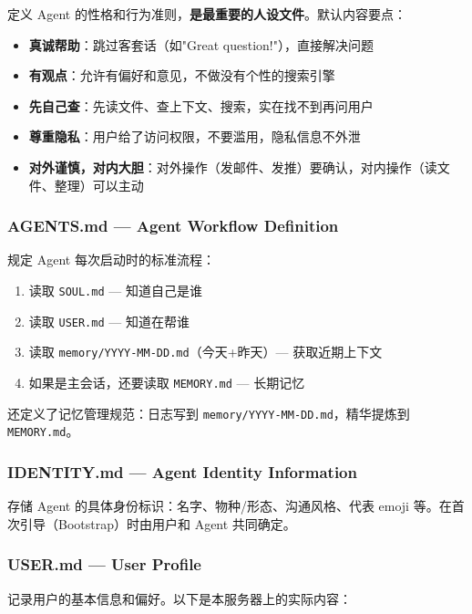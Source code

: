 定义 Agent 的性格和行为准则，\textbf{是最重要的人设文件}。默认内容要点：

\begin{itemize}
  \item \textbf{真诚帮助}：跳过客套话（如"Great question!"），直接解决问题
  \item \textbf{有观点}：允许有偏好和意见，不做没有个性的搜索引擎
  \item \textbf{先自己查}：先读文件、查上下文、搜索，实在找不到再问用户
  \item \textbf{尊重隐私}：用户给了访问权限，不要滥用，隐私信息不外泄
  \item \textbf{对外谨慎，对内大胆}：对外操作（发邮件、发推）要确认，对内操作（读文件、整理）可以主动
\end{itemize}

\subsubsection{AGENTS.md --- Agent Workflow Definition}


规定 Agent 每次启动时的标准流程：

\begin{enumerate}
  \item 读取 \texttt{SOUL.md} --- 知道自己是谁
  \item 读取 \texttt{USER.md} --- 知道在帮谁
  \item 读取 \texttt{memory/YYYY-MM-DD.md}（今天+昨天）--- 获取近期上下文
  \item 如果是主会话，还要读取 \texttt{MEMORY.md} --- 长期记忆
\end{enumerate}

还定义了记忆管理规范：日志写到 \texttt{memory/YYYY-MM-DD.md}，精华提炼到 \texttt{MEMORY.md}。

\subsubsection{IDENTITY.md --- Agent Identity Information}


存储 Agent 的具体身份标识：名字、物种/形态、沟通风格、代表 emoji 等。在首次引导（Bootstrap）时由用户和 Agent 共同确定。

\subsubsection{USER.md --- User Profile}


记录用户的基本信息和偏好。以下是本服务器上的实际内容：

